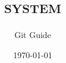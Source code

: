 \documentclass[Misc]{../../data/TelemacDoc} %
\begin{document}
\let\cleardoublepage\clearpage

\title{\tel \mbox{\scshape{system}}}
\subtitle{Git Guide}
\version{\telmaversion}
\date{\today}
\maketitle
\clearpage



\newpage

\thispagestyle{empty}

\TelemacCopyright{}




\pagestyle{empty} %

\tableofcontents%


\pagestyle{fancy} %








\end{document}
